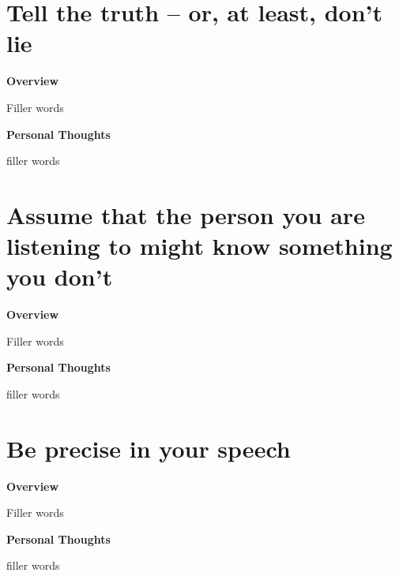\documentclass{article}
\begin{document}
\section{Tell the truth – or, at least, don't lie}
        \begin{multicols}{2}
        \begin{center}
            \textbf{Overview}
        \end{center}
        
        Filler words 

        \begin{center}
            \textbf{Personal Thoughts}
        \end{center}
        
        filler words
    \end{multicols}
    
\section{Assume that the person you are listening to might know something you don't}
        \begin{multicols}{2}
        \begin{center}
            \textbf{Overview}
        \end{center}
        
        Filler words 

        \begin{center}
            \textbf{Personal Thoughts}
        \end{center}
        
        filler words
    \end{multicols}

\section{Be precise in your speech}
        \begin{multicols}{2}
        \begin{center}
            \textbf{Overview}
        \end{center}
        
        Filler words 

        \begin{center}
            \textbf{Personal Thoughts}
        \end{center}
        
        filler words
    \end{multicols}
    
\end{document}
